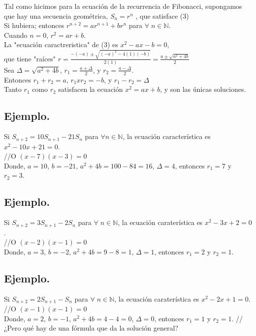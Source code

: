 \documentclass{article}
\begin{document}
Tal como hicimos para la ecuación de la recurrencia de Fibonacci, supongamos que hay una secuencia geométrica, $S_n = r^n$ , que satisface (3)\\

Si hubiera; entonces $r^{n+2} = ar^{n+1} + br^{n}$ para $\forall \; n \in \mathbb{N}$.\\

Cuando $n = 0$,  $r^2 = ar + b$.\\

La "ecuación caractreristica" de (3) es $x^2 -ax-b=0$,\\

que tiene "raíces" $r = \frac{-(-a) \pm \sqrt{(-a)^2 - 4(1)(-b)}}{2(1)} = \frac{a \pm \sqrt{a^2 + 4b}}{2}$\\

Sea $\Delta = \sqrt{a^2 + 4b}$, $r_1 = \frac{a + \Delta}{2}$, y $r_2 = \frac{a - \Delta}{2}$.\\

Entonces $r_1 + r_2 = a$, $r_1 \textit{x} r_2 = -b$, y $r_1 - r_2 = \Delta $ \\

Tanto $r_1$ como $r_2$ satisfacen la ecuación $x^2 = ax + b$, y son las únicas soluciones.

\subsection{Ejemplo.}
Si $S_{n+2} = 10S_{n+1} - 21S_n$ para $\forall n \in \mathbb{N}$, la ecuación característica es $x^2 - 10x +21 = 0$.\\
//O $(x-7)(x-3)=0$\\
Donde, $a=10$, $b=-21$, $a^2+4b=100-84=16$, $\Delta = 4$, entonces $r_1 = 7$ y $r_2 = 3$.

\subsection{Ejemplo.}
Si $S_{n+2} = 3S_{n+1}-2S_{n}$ para $\forall \; n \in \mathbb{N}$, la ecuación caraterística es $x^2-3x+2=0$.\\
//O $(x-2)(x-1)=0$\\
Donde, $a=3$, $b=-2$, $a^2+4b=9-8=1$, $\Delta = 1$, entonces $r_1=2$ y $r_2=1$.


\subsection{Ejemplo.}
Si $S_{n+2} = 2S_{n+1}- S_{n}$ para $\forall \; n \in \mathbb{N}$, la ecuación caraterística es $x^2-2x+1=0$.\\
//O $(x-1)(x-1)=0$\\
Donde, $a=2$, $b=-1$, $a^2+4b=4-4=0$, $\Delta = 0$, entonces $r_1=1$ y $r_2=1$.
// ¿Pero qué hay de una fórmula que da la solución general?
\end{document}
